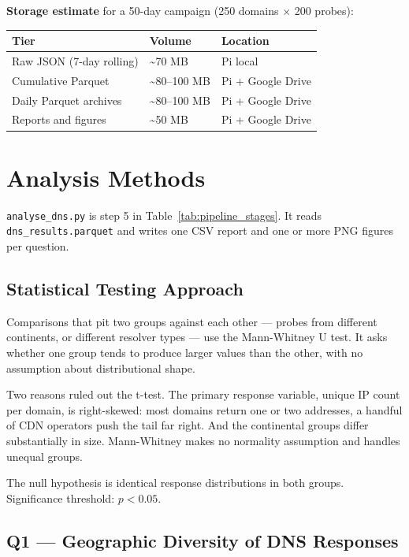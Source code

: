 \textbf{Storage estimate} for a 50-day campaign (250 domains $\times$ 200 probes):

\begin{table}[H]
\centering
\small
\begin{tabular}{l l l}
\toprule
\textbf{Tier} & \textbf{Volume} & \textbf{Location} \\
\midrule
Raw JSON (7-day rolling) & \textasciitilde{}70 MB & Pi local \\
Cumulative Parquet & \textasciitilde{}80--100 MB & Pi + Google Drive \\
Daily Parquet archives & \textasciitilde{}80--100 MB & Pi + Google Drive \\
Reports and figures & \textasciitilde{}50 MB & Pi + Google Drive \\
\bottomrule
\end{tabular}
\end{table}

\bigskip
\section{Analysis Methods}
\label{sec:3.5}

\texttt{analyse\_dns.py} is step 5 in Table~\ref{tab:pipeline_stages}. It reads \texttt{dns\_results.parquet} and writes one CSV report and one or more PNG figures per question.

\subsection{Statistical Testing Approach}
\label{subsec:3.5.0}

Comparisons that pit two groups against each other --- probes from different continents, or different resolver types --- use the Mann-Whitney U test. It asks whether one group tends to produce larger values than the other, with no assumption about distributional shape.

Two reasons ruled out the t-test. The primary response variable, unique \ac{IP} count per domain, is right-skewed: most domains return one or two addresses, a handful of \ac{CDN} operators push the tail far right. And the continental groups differ substantially in size. Mann-Whitney makes no normality assumption and handles unequal groups.

The null hypothesis is identical response distributions in both groups. Significance threshold: $p < 0.05$.

\subsection{Q1 --- Geographic Diversity of DNS Responses}
\label{subsec:3.5.1}

